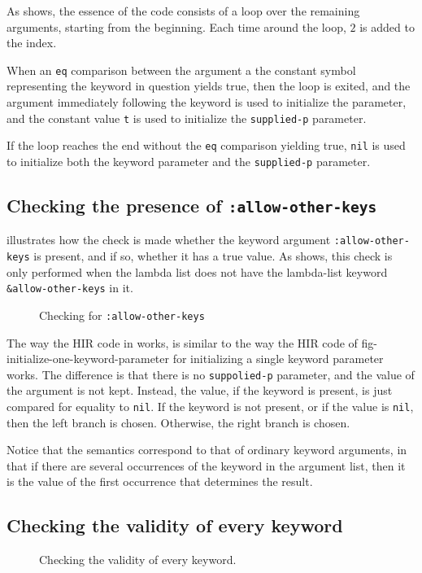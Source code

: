 As  shows, the essence of
the code consists of a loop over the remaining arguments, starting
from the beginning.  Each time around the loop, $2$ is added to the
index.

When an \texttt{eq} comparison between the argument a the constant
symbol representing the keyword in question yields true, then the loop
is exited, and the argument immediately following the keyword is used
to initialize the parameter, and the constant value \texttt{t} is used
to initialize the \texttt{supplied-p} parameter.

If the loop reaches the end without the \texttt{eq} comparison
yielding true, \texttt{nil} is used to initialize both the keyword
parameter and the \texttt{supplied-p} parameter.

\subsection{Checking the presence of \texttt{:allow-other-keys}}

 illustrates how the check is made
whether the keyword argument \texttt{:allow-other-keys} is present,
and if so, whether it has a true value.  As
 shows, this check is only
performed when the lambda list does not have the lambda-list keyword
\texttt{\&allow-other-keys} in it.

\begin{figure}
\begin{center}
\end{center}
\caption{\label{fig-check-allow-other-keys}
Checking for \texttt{:allow-other-keys}}
\end{figure}

The way the HIR code in  works, is
similar to the way the HIR code of
{fig-initialize-one-keyword-parameter} for initializing a single
keyword parameter works.  The difference is that there is no
\texttt{suppolied-p} parameter, and the value of the argument is not
kept.  Instead, the value, if the keyword is present, is just compared
for equality to \texttt{nil}.  If the keyword is not present, or if
the value is \texttt{nil}, then the left branch is chosen.  Otherwise,
the right branch is chosen.

Notice that the semantics correspond to that of ordinary keyword
arguments, in that if there are several occurrences of the keyword in
the argument list, then it is the value of the first occurrence that
determines the result.

\subsection{Checking the validity of every keyword}

\begin{figure}
\begin{center}
\end{center}
\caption{\label{fig-check-every-keyword}
Checking the validity of every keyword.}
\end{figure}

